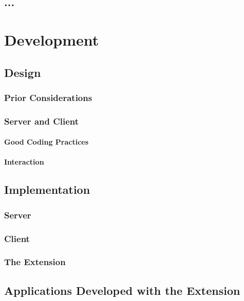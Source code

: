 \documentclass[bsc,frontabs,twoside,singlespacing,parskip,deptreport]{infthesis}     %
\begin{document}
\section{...}





\chapter{Development}

\section{Design}
\subsection{Prior Considerations}
\subsection{Server and Client}
\subsubsection{Good Coding Practices}
\subsubsection{Interaction}

\section{Implementation}
\subsection{Server}
\subsection{Client}
\subsection{The Extension}
\section{Applications Developed with the Extension}
\end{document}
